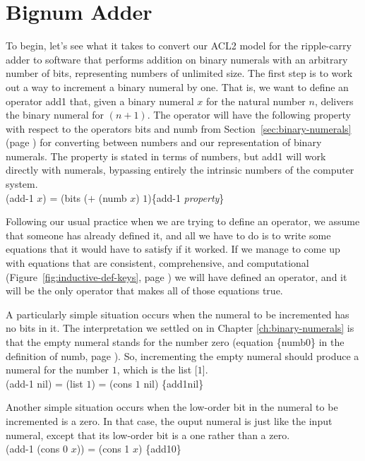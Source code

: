 \section{Bignum Adder}
\label{sec:bignum-adder}

To begin, let's see what it takes to convert our ACL2 model for
the ripple-carry adder to software that performs addition on
binary numerals with an arbitrary number of bits,
representing numbers of unlimited size.
The first step is to work out a way to increment a
binary numeral by one.
That is,
we want to define an operator add1 that, given a
binary numeral $x$ for the natural number $n$, delivers the
binary numeral for $(n+1)$.
The operator will have the following
property with respect to the operators bits and numb from
Section~\ref{sec:binary-numerals} (page \pageref{bits-defun})
for converting between numbers and our representation
of binary numerals. The property is stated in terms of numbers,
but add1 will work directly with numerals,
bypassing entirely the intrinsic numbers of the computer system.
\\
\vspace{2mm}
\hspace*{2cm}
(add-1 $x$) = (bits ($+$ (numb $x$) $1$)\hfill\{add-1 \emph{property}\}

Following our usual practice when we are trying to define an operator,
we assume that someone has already defined it,
and all we have to do is to write some equations that it
would have to satisfy if it worked. If we manage
to come up with equations that are consistent, comprehensive, and computational
(Figure~\ref{fig:inductive-def-keys}, page \pageref{fig:inductive-def-keys})
we will have defined an operator,
and it will be the only operator that makes all of those equations true.

A particularly simple situation occurs when the numeral to be incremented
has no bits in it. The interpretation we settled on
in Chapter \ref{ch:binary-numerals} is that
the empty numeral stands for the number zero
(equation \{numb0\} in the definition of numb, page \pageref{nmb-defun}).
So, incrementing the empty numeral should produce a numeral for the number $1$,
which is the list [$1$].
\\
\vspace{2mm}
\hspace*{2cm}
(add-1 nil) = (list $1$) = (cons $1$ nil)  \hfill \{add1nil\}

Another simple situation occurs when the low-order bit in the
numeral to be incremented is a zero.
In that case, the ouput numeral is
just like the input numeral, except that its
low-order bit is a one rather than a zero.
\\
\vspace{2mm}
\hspace*{2cm}
(add-1 (cons 0 $x$)) = (cons 1 $x$)    \hfill \{add10\}


